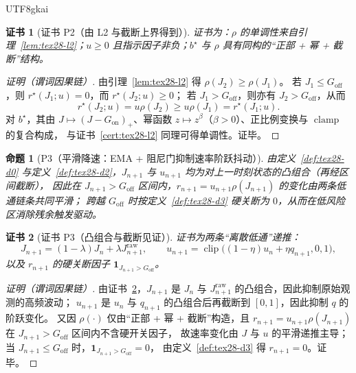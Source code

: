\documentclass[12pt]{article}
\newtheorem{proposition}{命题}[section]
\newtheorem{Certificate}{证书}[section]
\newcommand{\indicator}[1]{\mathbf{1}_{#1}}
\newcommand{\clip}{\operatorname{clip}}
\newcommand{\clamp}{\operatorname{clamp}}
\begin{document}
\begin{CJK*}{UTF8}{gkai}
\begin{Certificate}[证书 P2（由 L2 与截断上界得到）]
\label{cert:tex28-p2}
证书为：$\rho$ 的单调性来自引理~\ref{lem:tex28-l2}；$u\ge 0$ 且指示因子非负；$b^\star$ 与 $\rho$ 具有同构的“正部 + 幂 + 截断”结构。
\end{Certificate}

\begin{proof}[证明（谓词因果链）]
由引理~\ref{lem:tex28-l2} 得 $\rho(J_2)\ge \rho(J_1)$。
若 $J_1\le G_{\mathrm{off}}$，则 $r^\star(J_1;u)=0$，而 $r^\star(J_2;u)\ge 0$；
若 $J_1>G_{\mathrm{off}}$，则亦有 $J_2>G_{\mathrm{off}}$，从而
\[
  r^\star(J_2;u)=u\rho(J_2)\ge u\rho(J_1)=r^\star(J_1;u).
\]
对 $b^\star$，其由 $J\mapsto (J-G_{\mathrm{on}})_{+}$、幂函数 $z\mapsto z^\beta$（$\beta>0$）、正比例变换与 $\clamp$ 的复合构成，
与证书~\ref{cert:tex28-l2} 同理可得单调性。证毕。
\end{proof}

\begin{proposition}[P3（平滑降速：EMA + 阻尼门抑制速率阶跃抖动）]
\label{prop:tex28-p3}
由定义~\ref{def:tex28-d0} 与定义~\ref{def:tex28-d2}，$J_{n+1}$ 与 $u_{n+1}$ 均为对上一时刻状态的凸组合（再经区间截断），
因此在 $J_{n+1}>G_{\mathrm{off}}$ 区间内，$r_{n+1}=u_{n+1}\rho(J_{n+1})$ 的变化由两条低通链条共同平滑；
跨越 $G_{\mathrm{off}}$ 时按定义~\ref{def:tex28-d3} 硬关断为 $0$，从而在低风险区消除残余触发驱动。
\end{proposition}

\begin{Certificate}[证书 P3（凸组合与截断见证）]
\label{cert:tex28-p3}
证书为两条“离散低通”递推：
\[
  J_{n+1}=(1-\lambda)J_n+\lambda J^{\mathrm{raw}}_{n+1},\qquad
  u_{n+1}=\clip\bigl((1-\eta)u_n+\eta q_{n+1},0,1\bigr),
\]
以及 $r_{n+1}$ 的硬关断因子 $\indicator{J_{n+1}>G_{\mathrm{off}}}$。
\end{Certificate}

\begin{proof}[证明（谓词因果链）]
由证书~\ref{cert:tex28-p3}，$J_{n+1}$ 是 $J_n$ 与 $J^{\mathrm{raw}}_{n+1}$ 的凸组合，因此抑制原始观测的高频波动；
$u_{n+1}$ 是 $u_n$ 与 $q_{n+1}$ 的凸组合后再截断到 $[0,1]$，因此抑制 $q$ 的阶跃变化。
又因 $\rho(\cdot)$ 仅由“正部 + 幂 + 截断”构造，且 $r_{n+1}=u_{n+1}\rho(J_{n+1})$ 在 $J_{n+1}>G_{\mathrm{off}}$ 区间内不含硬开关因子，
故速率变化由 $J$ 与 $u$ 的平滑递推主导；当 $J_{n+1}\le G_{\mathrm{off}}$ 时，$\indicator{J_{n+1}>G_{\mathrm{off}}}=0$，
由定义~\ref{def:tex28-d3} 得 $r_{n+1}=0$。证毕。
\end{proof}


\end{CJK*}
\end{document}
